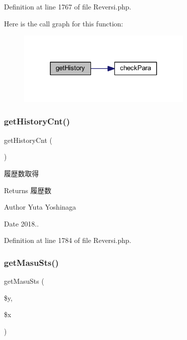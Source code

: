 Definition at line 1767 of file Reversi.\+php.

Here is the call graph for this function\+:
\nopagebreak
\begin{figure}[H]
\begin{center}
\leavevmode
\includegraphics[width=240pt]{class_reversi_a41cae82a798f2b3d0684bda44b837fcf_cgraph}
\end{center}
\end{figure}
\mbox{\label{class_reversi_a004834cf9f95ab56b62c1305bbc68ce2}} 
\subsubsection{\texorpdfstring{get\+History\+Cnt()}{getHistoryCnt()}}
{\footnotesize\ttfamily get\+History\+Cnt (\begin{DoxyParamCaption}{ }\end{DoxyParamCaption})}



履歴数取得 

\begin{DoxyReturn}{Returns}
履歴数 
\end{DoxyReturn}
\begin{DoxyAuthor}{Author}
Yuta Yoshinaga 
\end{DoxyAuthor}
\begin{DoxyDate}{Date}
2018.. 
\end{DoxyDate}


Definition at line 1784 of file Reversi.\+php.

\mbox{\label{class_reversi_a1baed538e7a503cd51850d368b9e65f7}} 
\subsubsection{\texorpdfstring{get\+Masu\+Sts()}{getMasuSts()}}
{\footnotesize\ttfamily get\+Masu\+Sts (\begin{DoxyParamCaption}\item[{}]{\$y,  }\item[{}]{\$x }\end{DoxyParamCaption})}



